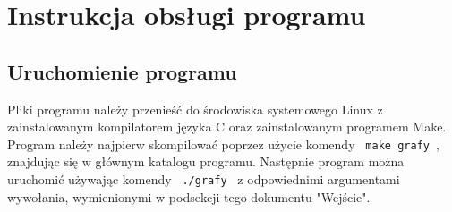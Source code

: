 \documentclass{article}
\begin{document}
\section{Instrukcja obsługi programu}

\subsection{Uruchomienie programu}
Pliki programu należy przenieść do środowiska systemowego Linux z zainstalowanym kompilatorem języka C oraz zainstalowanym programem Make.
Program należy najpierw skompilować poprzez użycie komendy \texttt{ make grafy }, znajdując się w głównym katalogu programu.
Następnie program można uruchomić używając komendy \texttt{ ./grafy } z odpowiednimi argumentami wywołania, wymienionymi w podsekcji tego dokumentu "Wejście".
\end{document}
